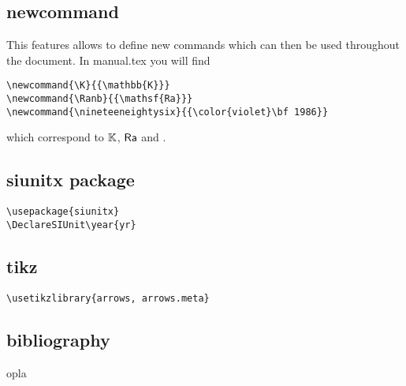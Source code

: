 

\subsection*{newcommand}

This features allows to define new commands which can then be used throughout the document. 
In {\filenamefont manual.tex} you will find

\begin{verbatim}
\newcommand{\K}{{\mathbb{K}}}
\newcommand{\Ranb}{{\mathsf{Ra}}}
\newcommand{\nineteeneightysix}{{\color{violet}\bf 1986}}
\end{verbatim}

which correspond to $\K$, $\Ranb$ and \nineteeneightysix.


\subsection*{siunitx package}

\begin{verbatim}
\usepackage{siunitx} 
\DeclareSIUnit\year{yr}
\end{verbatim}


\subsection*{tikz}


\begin{verbatim}
\usetikzlibrary{arrows, arrows.meta}
\end{verbatim}


\subsection*{bibliography}

opla
